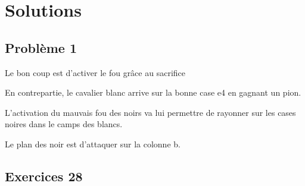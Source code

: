 
\newpage
\section{Solutions}

\subsection{Problème 1}%
\newgame
{}
\begin{minipage}{0.45\textwidth}
\hspace{0.7cm} Le bon coup est d'activer le fou grâce au sacrifice %
\vspace{0.25cm}

\hspace{0.7cm} En contrepartie, le cavalier blanc arrive sur la bonne case e4 en gagnant un pion.
\vspace{0.25cm}

\hspace{0.7cm} L'activation du mauvais fou des noirs va lui permettre de rayonner sur les cases noires dans le camps des blancs. %
\vspace{0.25cm}

\hspace{0.7cm} Le plan des noir est d'attaquer sur la colonne b.
\end{minipage}
\hfill
\begin{minipage}{0.45\textwidth}
\chessboard[
inverse,markstyle=leftborder,
]
\end{minipage}

\begin{minipage}{0.45\textwidth}
\hspace{0.7cm} %
\vspace{0.25cm}
\end{minipage}
\hfill
\begin{minipage}{0.45\textwidth}
\chessboard[
inverse,markstyle=leftborder,
]
\end{minipage}

\subsection{Exercices 28} %
